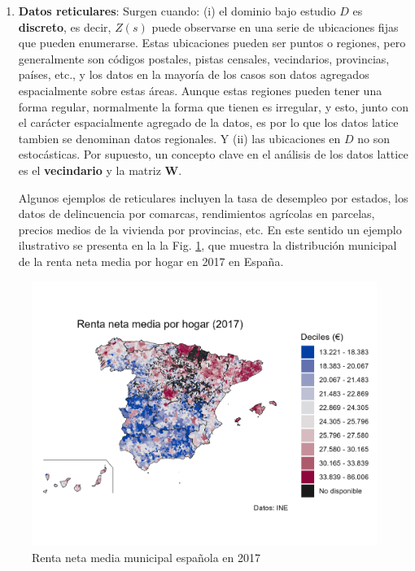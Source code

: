 \documentclass[
]{report}
\theoremstyle{definition}
\theoremstyle{definition}
\theoremstyle{definition}
\theoremstyle{definition}
\theoremstyle{remark}
\begin{document}
\begin{enumerate}
\def\labelenumi{\arabic{enumi}.}
\setcounter{enumi}{1}
\item
  \textbf{Datos reticulares}: Surgen cuando: (i) el dominio bajo estudio \(D\) es
  \textbf{discreto}, es decir, \(Z(s)\) puede observarse en una serie de ubicaciones
  fijas que pueden enumerarse. Estas ubicaciones pueden ser puntos o regiones,
  pero generalmente son códigos postales, pistas censales, vecindarios,
  provincias, países, etc., y los datos en la mayoría de los casos son datos
  agregados espacialmente sobre estas áreas. Aunque estas regiones pueden
  tener una forma regular, normalmente la forma que tienen es irregular, y
  esto, junto con el carácter espacialmente agregado de la datos, es por lo
  que los datos latice tambien se denominan datos regionales. Y (ii) las
  ubicaciones en \(D\) no son estocásticas. Por supuesto, un concepto clave en
  el análisis de los datos lattice es el \textbf{vecindario} y la matriz \textbf{W}.

  Algunos ejemplos de reticulares incluyen la tasa de desempleo por estados,
  los datos de delincuencia por comarcas, rendimientos agrícolas en parcelas,
  precios medios de la vivienda por provincias, etc. En este sentido un
  ejemplo ilustrativo se presenta en la la Fig. \ref{fig:ejem-lattice}, que
  muestra la distribución municipal de la renta neta media por hogar en 2017
  en España.
\end{enumerate}

\begin{figure}

{\centering \includegraphics[width=0.6\linewidth]{img/renta2017} 

}

\caption{Renta neta media municipal española en 2017}\label{fig:ejem-lattice}
\end{figure}
\end{document}
